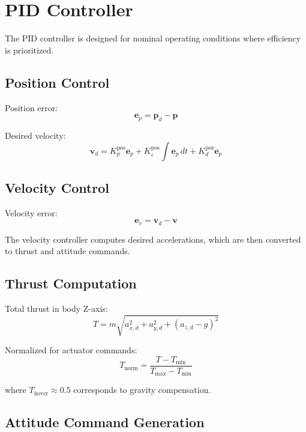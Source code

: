 \section{PID Controller}

The PID controller is designed for nominal operating conditions where efficiency is prioritized.

\subsection{Position Control}

Position error:
\begin{equation}
    \mathbf{e}_p = \mathbf{p}_d - \mathbf{p}
\end{equation}

Desired velocity:
\begin{equation}
    \mathbf{v}_d = K_p^{\text{pos}} \mathbf{e}_p + K_i^{\text{pos}} \int \mathbf{e}_p \, dt + K_d^{\text{pos}} \dot{\mathbf{e}}_p
\end{equation}

\subsection{Velocity Control}

Velocity error:
\begin{equation}
    \mathbf{e}_v = \mathbf{v}_d - \mathbf{v}
\end{equation}

The velocity controller computes desired accelerations, which are then converted to thrust and attitude commands.

\subsection{Thrust Computation}

Total thrust in body Z-axis:
\begin{equation}
    T = m \sqrt{a_{x,d}^2 + a_{y,d}^2 + (a_{z,d} - g)^2}
\end{equation}

Normalized for actuator commands:
\begin{equation}
    T_{\text{norm}} = \frac{T - T_{\min}}{T_{\max} - T_{\min}}
\end{equation}

where $T_{\text{hover}} \approx 0.5$ corresponds to gravity compensation.

\subsection{Attitude Command Generation}

